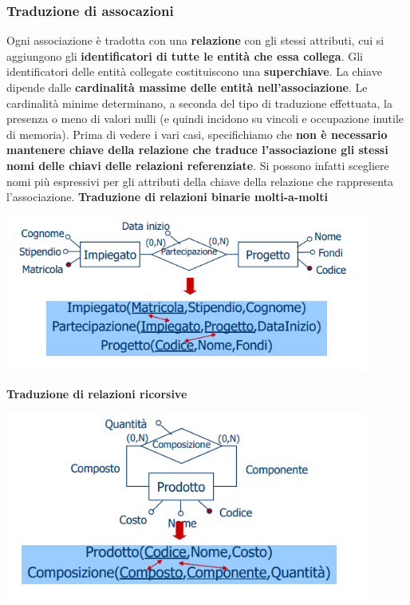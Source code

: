 \documentclass[12pt]{article}
\begin{document}
\subsubsection{Traduzione di assocazioni}
Ogni associazione è tradotta con una \textbf{relazione} con gli stessi attributi, cui si aggiungono gli \textbf{identificatori di tutte le entità che essa collega}.
Gli identificatori delle entità collegate costituiscono una \textbf{superchiave}.
La chiave dipende dalle \textbf{cardinalità massime delle entità nell'associazione}.
Le cardinalità minime determinano, a seconda del tipo di traduzione effettuata, la presenza o meno di valori nulli (e quindi incidono su vincoli e occupazione inutile di memoria).
Prima di vedere i vari casi, specifichiamo che \textbf{non è necessario mantenere chiave della relazione che traduce l'associazione gli stessi nomi delle chiavi delle relazioni referenziate}.
Si possono infatti scegliere nomi più espressivi per gli attributi della chiave della relazione che rappresenta l'associazione.
\newpage
\noindent
\textbf{Traduzione di relazioni binarie molti-a-molti}
\begin{center}
    \includegraphics[width = 0.90\textwidth]{Images/113.PNG}
\end{center}
\textbf{Traduzione di relazioni ricorsive}
\begin{center}
    \includegraphics[width = 0.90\textwidth]{Images/114.PNG}
\end{center}
\end{document}
